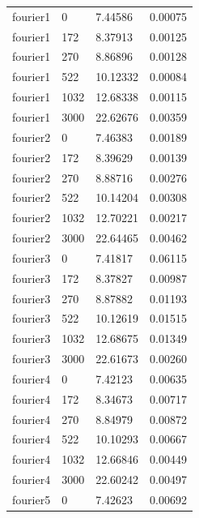 \begin{longtable}{p{2.0cm} p{2.0cm} p{4.0cm} p{2.0cm}}
        fourier1  & 0            & 7.44586          & 0.00075 \\
        fourier1  & 172          & 8.37913          & 0.00125 \\
        fourier1  & 270          & 8.86896          & 0.00128 \\
        fourier1  & 522          & 10.12332         & 0.00084 \\
        fourier1  & 1032         & 12.68338         & 0.00115 \\
        fourier1  & 3000         & 22.62676         & 0.00359 \\
        \midrule
        fourier2  & 0            & 7.46383          & 0.00189 \\
        fourier2  & 172          & 8.39629          & 0.00139 \\
        fourier2  & 270          & 8.88716          & 0.00276 \\
        fourier2  & 522          & 10.14204         & 0.00308 \\
        fourier2  & 1032         & 12.70221         & 0.00217 \\
        fourier2  & 3000         & 22.64465         & 0.00462 \\
        \midrule
        fourier3  & 0            & 7.41817          & 0.06115 \\
        fourier3  & 172          & 8.37827          & 0.00987 \\
        fourier3  & 270          & 8.87882          & 0.01193 \\
        fourier3  & 522          & 10.12619         & 0.01515 \\
        fourier3  & 1032         & 12.68675         & 0.01349 \\
        fourier3  & 3000         & 22.61673         & 0.00260 \\
        \midrule
        fourier4  & 0            & 7.42123          & 0.00635 \\
        fourier4  & 172          & 8.34673          & 0.00717 \\
        fourier4  & 270          & 8.84979          & 0.00872 \\
        fourier4  & 522          & 10.10293         & 0.00667 \\
        fourier4  & 1032         & 12.66846         & 0.00449 \\
        fourier4  & 3000         & 22.60242         & 0.00497 \\
        \midrule
        fourier5  & 0            & 7.42623          & 0.00692 \\

\end{longtable}
